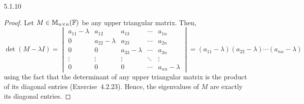 \documentclass{exam}
\begin{document}
  \begin{problem}{5.1.10}
    \begin{proof}
      Let $M \in \mathbb M_{n \times n}(\mathbb F)$ be any upper triangular matrix. Then, 
      \[
        \det(M - \lambda I) = \begin{vmatrix}
          a_{11} - \lambda & a_{12} & a_{13} & \cdots & a_{1n} \\
          0 & a_{22} - \lambda & a_{23} & \cdots & a_{2n}  \\
          0 & 0 & a_{33} - \lambda & \cdots & a_{3n} \\
          \vdots & \vdots & \vdots & \ddots & \vdots \\
          0 & 0 & 0 & \cdots & a_{nn} - \lambda
        \end{vmatrix}
        = (a_{11} - \lambda)(a_{22} - \lambda) \cdots (a_{nn} - \lambda)
      \]
      using the fact that the determinant of any upper triangular matrix is the product of its diagonal entries (Exercise~$4.2.23$). Hence, the eigenvalues of $M$ are exactly its diagonal entries.
    \end{proof}
  \end{problem}

  \newpage 
\end{document}
